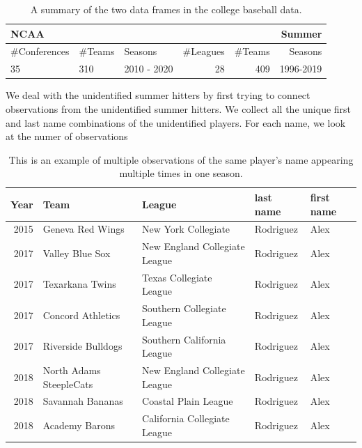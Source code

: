 \documentclass [52pt] {article}
\begin{document}
\begin{table}
\centering
\begin{tabular}{lllrrr}
  \hline
\multicolumn{3}{l}{NCAA}&\multicolumn{3}{r}{Summer}\\
  \hline
\#Conferences & \#Teams & Seasons  & \#Leagues & \#Teams & Seasons\\
\hline
35 & 310 & 2010 - 2020 & 28  & 409  & 1996-2019\\
\hline
\end{tabular}
\caption{\label{tab : cdata_sum} A summary of the two data frames in the college baseball data.}
\end{table}

We deal with the unidentified summer hitters by first trying to connect observations from the unidentified summer hitters.  We collect all the unique first and last name combinations of the unidentified players.  For each name, we look at the numer of observations 

\begin{table}[ht]
\centering
\begin{tabular}{rllll}
  \hline
 Year & Team & League & last name & first name \\ 
  \hline
2015 & Geneva Red Wings & New York Collegiate & Rodriguez & Alex \\ 
 2017 & Valley Blue Sox & New England Collegiate League & Rodriguez & Alex \\ 
  2017 & Texarkana Twins & Texas Collegiate League & Rodriguez & Alex \\ 
  2017 & Concord Athletics & Southern Collegiate League & Rodriguez & Alex \\ 
 2017 & Riverside Bulldogs & Southern California League & Rodriguez & Alex \\ 
 2018 & North Adams SteepleCats & New England Collegiate League & Rodriguez & Alex \\ 
  2018 & Savannah Bananas & Coastal Plain League & Rodriguez & Alex \\ 
  2018 & Academy Barons & California Collegiate League & Rodriguez & Alex \\ 
   \hline
\end{tabular}
\caption{\label{tab : arod} This is an example of multiple observations of the same player's name appearing multiple times in one season.}
\end{table}
\end{document}
